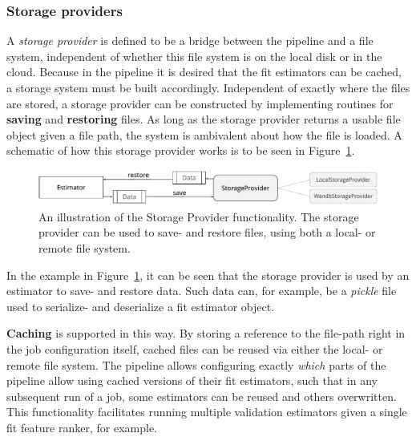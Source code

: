 \documentclass[../main.tex]{subfiles}
\begin{document}
\subsubsection{Storage providers}\label{section:pipeline-storage-provider}
A \textit{storage provider} is defined to be a bridge between the pipeline and a file system, independent of whether this file system is on the local disk or in the cloud. Because in the pipeline it is desired that the fit estimators can be cached, a storage system must be built accordingly. Independent of exactly where the files are stored, a storage provider can be constructed by implementing routines for \textbf{saving} and \textbf{restoring} files. As long as the storage provider returns a usable file object given a file path, the system is ambivalent about how the file is loaded. A schematic of how this storage provider works is to be seen in Figure~\ref{fig:schematic-storage-provider}.

\begin{figure}[ht]
    \centering
    \includegraphics[width=\linewidth]{report/images/schematic-storage-provider.pdf}
    \caption{An illustration of the Storage Provider functionality. The storage provider can be used to save- and restore files, using both a local- or remote file system.}
    \label{fig:schematic-storage-provider}
\end{figure}

In the example in Figure~\ref{fig:schematic-storage-provider}, it can be seen that the storage provider is used by an estimator to save- and restore data. Such data can, for example, be a \textit{pickle} file used to serialize- and deserialize a fit estimator object.

\textbf{Caching} is supported in this way. By storing a reference to the file-path right in the job configuration itself, cached files can be reused via either the local- or remote file system. The pipeline allows configuring exactly \textit{which} parts of the pipeline allow using cached versions of their fit estimators, such that in any subsequent run of a job, some estimators can be reused and others overwritten. This functionality facilitates running multiple validation estimators given a single fit feature ranker, for example.
\end{document}
